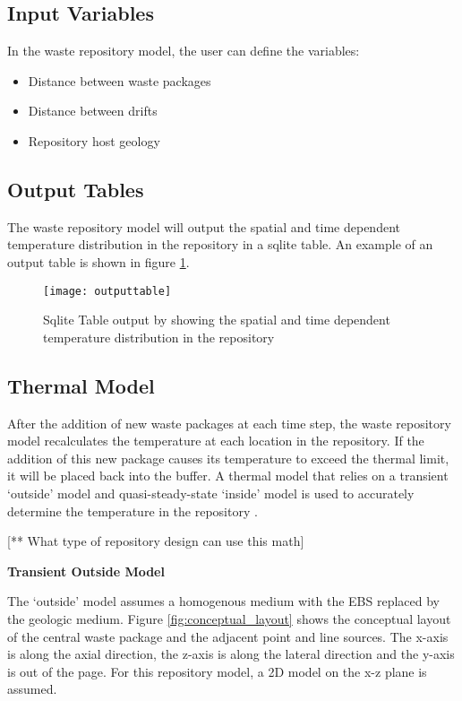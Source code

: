 \subsection{Input Variables}

In the waste repository model, the user can define the variables: 
	\begin{itemize}
		\item Distance between waste packages
		\item Distance between drifts 
		\item Repository host geology 
	\end{itemize}
	
\subsection{Output Tables}
The waste repository model will output the spatial and time 
dependent temperature distribution in the repository in a sqlite 
table. An example of an output table is shown in figure 
\ref{fig:outputtable}. 

\begin{figure}[h]
	\texttt{[image: outputtable]}
	\caption{Sqlite Table output by \Cyclus showing the spatial and 
	time dependent temperature distribution in the repository}
    \label{fig:outputtable}
\end{figure}

\subsection{Thermal Model}
After the addition of new waste packages at each time step, the 
waste repository model recalculates the temperature at each location
in the repository. 
If the addition of this new package causes its temperature to exceed
the thermal limit, it will be placed back into the buffer. 
A thermal model that relies on a transient `outside' model and 
quasi-steady-state `inside' model is used to accurately determine 
the temperature in the repository \cite{sutton_investigations_2011}.

[** What type of repository design can use this math]

\noindent
\textbf{Transient Outside Model}

The `outside' model assumes a homogenous medium with the \gls{EBS} 
replaced by the geologic medium. 
Figure \ref{fig:conceptual_layout} shows the conceptual layout of 
the central waste package and the adjacent point and line sources. 
The x-axis is along the axial direction, the z-axis is along the 
lateral direction and the y-axis is out of the page. 
For this repository model, a 2D model on the x-z plane is assumed. 

